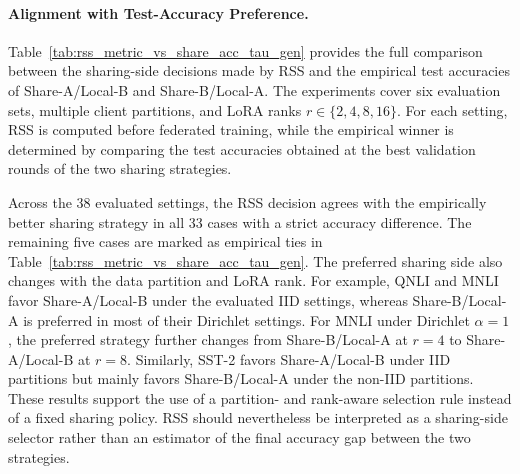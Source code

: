 \documentclass[lettersize,journal]{IEEEtran}
\begin{document}
	{\color{black}\paragraph{Alignment with Test-Accuracy Preference.}Table~\ref{tab:rss_metric_vs_share_acc_tau_gen} provides the full comparison between the sharing-side decisions made by RSS and the empirical test accuracies of Share-A/Local-B and Share-B/Local-A. The experiments cover six evaluation sets, multiple client partitions, and LoRA ranks $r\in\{2,4,8,16\}$. For each setting, RSS is computed before federated training, while the empirical winner is determined by comparing the test accuracies obtained at the best validation rounds of the two sharing strategies.
		
		Across the 38 evaluated settings, the RSS decision agrees with the empirically better sharing strategy in all 33 cases with a strict accuracy difference. The remaining five cases are marked as empirical ties in Table~\ref{tab:rss_metric_vs_share_acc_tau_gen}. The preferred sharing side also changes with the data partition and LoRA rank. For example, QNLI and MNLI favor Share-A/Local-B under the evaluated IID settings, whereas Share-B/Local-A is preferred in most of their Dirichlet settings. For MNLI under Dirichlet $\alpha=1$, the preferred strategy further changes from Share-B/Local-A at $r=4$ to Share-A/Local-B at $r=8$. Similarly, SST-2 favors Share-A/Local-B under IID partitions but mainly favors Share-B/Local-A under the non-IID partitions. These results support the use of a partition- and rank-aware selection rule instead of a fixed sharing policy. RSS should nevertheless be interpreted as a sharing-side selector rather than an estimator of the final accuracy gap between the two strategies.}
\end{document}
